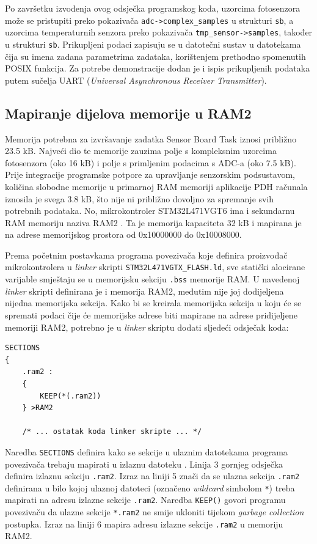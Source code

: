 Po završetku izvođenja ovog odsječka programskog koda, uzorcima fotosenzora može se pristupiti preko pokazivača \texttt{adc->complex\_samples} u strukturi \texttt{sb}, a uzorcima temperaturnih senzora preko pokazivača \texttt{tmp\_sensor->samples}, također u strukturi \texttt{sb}. Prikupljeni podaci zapisuju se u datotečni sustav u datotekama čija su imena zadana parametrima zadataka, korištenjem prethodno spomenutih POSIX funkcija. Za potrebe demonstracije dodan je i ispis prikupljenih podataka putem sučelja UART (\textit{Universal Asynchronous Receiver Transmitter}).

\subsection{Mapiranje dijelova memorije u RAM2}

Memorija potrebna za izvršavanje zadatka Sensor Board Task iznosi približno 23.5 kB. Najveći dio te memorije zauzima polje s kompleksnim uzorcima fotosenzora (oko 16 kB) i polje s primljenim podacima s ADC-a (oko 7.5 kB). Prije integracije programske potpore za upravljanje senzorskim podsustavom, količina slobodne memorije u primarnoj RAM memoriji aplikacije PDH računala iznosila je svega 3.8 kB, što nije ni približno dovoljno za spremanje svih potrebnih podataka. No, mikrokontroler STM32L471VGT6 ima i sekundarnu RAM memoriju naziva RAM2 \cite{stm32l4_manual}. Ta je memorija kapaciteta 32 kB i mapirana je na adrese memorijskog prostora od 0x10000000 do 0x10008000.

Prema početnim postavkama programa povezivača  koje definira proizvođač mikrokontrolera u \textit{linker} skripti \texttt{STM32L471VGTX\_FLASH.ld}, sve statički alocirane varijable smještaju se u memorijsku sekciju \texttt{.bss} memorije RAM. U navedenoj \textit{linker} skripti definirana je i memorija RAM2, međutim nije joj dodijeljena nijedna memorijska sekcija. Kako bi se kreirala memorijska sekcija u koju će se spremati podaci čije će memorijske adrese biti mapirane na adrese pridijeljene memoriji RAM2, potrebno je u \textit{linker} skriptu dodati sljedeći odsječak koda:

\begin{lstlisting}[caption={Smještanje memorijske sekcije \texttt{.ram2} u memoriju RAM2}]
SECTIONS
{
    .ram2 :
    {
        KEEP(*(.ram2))
    } >RAM2

    /* ... ostatak koda linker skripte ... */
\end{lstlisting}

Naredba \texttt{SECTIONS} definira kako se sekcije u ulaznim datotekama programa povezivača trebaju mapirati u izlaznu datoteku \cite{ld_dokumentacija}. Linija 3 gornjeg odsječka definira izlaznu sekciju \texttt{.ram2}. Izraz na liniji 5 znači da se ulazna sekcija \texttt{.ram2} definirana u bilo kojoj ulaznoj datoteci (označeno \textit{wildcard} simbolom \texttt{*}) treba mapirati na adresu izlazne sekcije \texttt{.ram2}. Naredba \texttt{KEEP()} govori programu povezivaču da ulazne sekcije \texttt{*.ram2} ne smije ukloniti tijekom \textit{garbage collection} postupka. Izraz na liniji 6 mapira adresu izlazne sekcije \texttt{.ram2} u memoriju RAM2.

